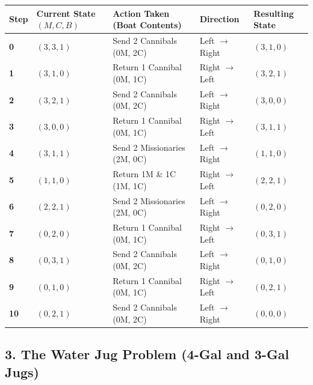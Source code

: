 \begin{table}[H]
\centering
\begin{tabular}{|p{}|p{}|p{}|p{}|p{}|}
\hline
Step & Current State $(M, C, B)$ & Action Taken (Boat Contents) & Direction & Resulting State \\
\hline
\textbf{0} & $(3, 3, 1)$ & Send 2 Cannibals (0M, 2C) & Left $\rightarrow$ Right & $(3, 1, 0)$ \\
\hline
\textbf{1} & $(3, 1, 0)$ & Return 1 Cannibal (0M, 1C) & Right $\rightarrow$ Left & $(3, 2, 1)$ \\
\hline
\textbf{2} & $(3, 2, 1)$ & Send 2 Cannibals (0M, 2C) & Left $\rightarrow$ Right & $(3, 0, 0)$ \\
\hline
\textbf{3} & $(3, 0, 0)$ & Return 1 Cannibal (0M, 1C) & Right $\rightarrow$ Left & $(3, 1, 1)$ \\
\hline
\textbf{4} & $(3, 1, 1)$ & Send 2 Missionaries (2M, 0C) & Left $\rightarrow$ Right & $(1, 1, 0)$ \\
\hline
\textbf{5} & $(1, 1, 0)$ & Return 1M \& 1C (1M, 1C) & Right $\rightarrow$ Left & $(2, 2, 1)$ \\
\hline
\textbf{6} & $(2, 2, 1)$ & Send 2 Missionaries (2M, 0C) & Left $\rightarrow$ Right & $(0, 2, 0)$ \\
\hline
\textbf{7} & $(0, 2, 0)$ & Return 1 Cannibal (0M, 1C) & Right $\rightarrow$ Left & $(0, 3, 1)$ \\
\hline
\textbf{8} & $(0, 3, 1)$ & Send 2 Cannibals (0M, 2C) & Left $\rightarrow$ Right & $(0, 1, 0)$ \\
\hline
\textbf{9} & $(0, 1, 0)$ & Return 1 Cannibal (0M, 1C) & Right $\rightarrow$ Left & $(0, 2, 1)$ \\
\hline
\textbf{10} & $(0, 2, 1)$ & Send 2 Cannibals (0M, 2C) & Left $\rightarrow$ Right & $(0, 0, 0)$ \\
\hline
\end{tabular}
\end{table}


\subsection{3. The Water Jug Problem (4-Gal and 3-Gal Jugs)}

